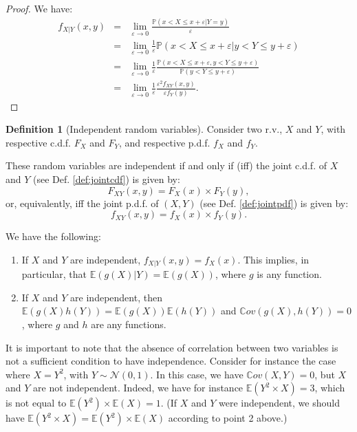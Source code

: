 \documentclass[
  12pt,
]{book}
\providecommand{\tightlist}{%
  \setlength{\itemsep}{0pt}\setlength{\parskip}{0pt}}
\theoremstyle{definition}
\newtheorem{definition}{Definition}[chapter]
\theoremstyle{definition}
\theoremstyle{definition}
\theoremstyle{definition}
\theoremstyle{remark}
\begin{document}
\begin{proof}
We have:
\begin{eqnarray*}
f_{X|Y}(x,y)&=&\lim_{\varepsilon \rightarrow 0} \frac{\mathbb{P}(x < X \le x + \varepsilon|Y=y)}{\varepsilon}\\
&=&\lim_{\varepsilon \rightarrow 0} \frac{1}{\varepsilon}\mathbb{P}(x < X \le x + \varepsilon|y<Y\le y+\varepsilon)\\
&=&\lim_{\varepsilon \rightarrow 0} \frac{1}{\varepsilon}\frac{\mathbb{P}(x < X \le x + \varepsilon,y<Y\le y+\varepsilon)}{\mathbb{P}(y<Y\le y+\varepsilon)}\\
&=&\lim_{\varepsilon \rightarrow 0} \frac{1}{\varepsilon} \frac{\varepsilon^2f_{XY}(x,y)}{\varepsilon f_{Y}(y)}.
\end{eqnarray*}
\end{proof}

\begin{definition}[Independent random variables]
\protect\hypertarget{def:independent}{}\label{def:independent}Consider two r.v., \(X\) and \(Y\), with respective c.d.f. \(F_X\) and \(F_Y\), and respective p.d.f. \(f_X\) and \(f_Y\).

These random variables are independent if and only if (iff) the joint c.d.f. of \(X\) and \(Y\) (see Def. \ref{def:jointcdf}) is given by:
\[
F_{XY}(x,y) = F_{X}(x) \times F_{Y}(y),
\]
or, equivalently, iff the joint p.d.f. of \((X,Y)\) (see Def. \ref{def:jointpdf}) is given by:
\[
f_{XY}(x,y) = f_{X}(x) \times f_{Y}(y).
\]
\end{definition}

We have the following:

\begin{enumerate}
\def\labelenumi{\arabic{enumi}.}
\tightlist
\item
  If \(X\) and \(Y\) are independent, \(f_{X|Y}(x,y)=f_{X}(x)\). This implies, in particular, that \(\mathbb{E}(g(X)|Y)=\mathbb{E}(g(X))\), where \(g\) is any function.
\item
  If \(X\) and \(Y\) are independent, then \(\mathbb{E}(g(X)h(Y))=\mathbb{E}(g(X))\mathbb{E}(h(Y))\) and \(\mathbb{C}ov(g(X),h(Y))=0\), where \(g\) and \(h\) are any functions.
\end{enumerate}

It is important to note that the absence of correlation between two variables is not a sufficient condition to have independence. Consider for instance the case where \(X=Y^2\), with \(Y \sim\mathcal{N}(0,1)\). In this case, we have \(\mathbb{C}ov(X,Y)=0\), but \(X\) and \(Y\) are not independent. Indeed, we have for instance \(\mathbb{E}(Y^2 \times X)=3\), which is not equal to \(\mathbb{E}(Y^2) \times \mathbb{E}(X)=1\). (If \(X\) and \(Y\) were independent, we should have \(\mathbb{E}(Y^2 \times X)=\mathbb{E}(Y^2) \times \mathbb{E}(X)\) according to point 2 above.)
\end{document}

